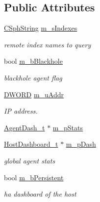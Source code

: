 \subsection*{Public Attributes}
\begin{DoxyCompactItemize}
\item 
\hyperlink{structCSphString}{C\-Sph\-String} \hyperlink{classAgentDesc__c_a027b0d2b65c7114eb9d98262484e6721}{m\-\_\-s\-Indexes}
\begin{DoxyCompactList}\small\item\em remote index names to query \end{DoxyCompactList}\item 
bool \hyperlink{classAgentDesc__c_a1b2031be7860d1ca7164e87299bfa331}{m\-\_\-b\-Blackhole}
\begin{DoxyCompactList}\small\item\em blackhole agent flag \end{DoxyCompactList}\item 
\hyperlink{sphinxstd_8h_a798af1e30bc65f319c1a246cecf59e39}{D\-W\-O\-R\-D} \hyperlink{classAgentDesc__c_a9f0f231fa4e195fb60e1ff31d39a9f9b}{m\-\_\-u\-Addr}
\begin{DoxyCompactList}\small\item\em I\-P address. \end{DoxyCompactList}\item 
\hyperlink{structAgentDash__t}{Agent\-Dash\-\_\-t} $\ast$ \hyperlink{classAgentDesc__c_aa307a0d445fbfdaed3e0f85d9eb3cc18}{m\-\_\-p\-Stats}
\item 
\hyperlink{structHostDashboard__t}{Host\-Dashboard\-\_\-t} $\ast$ \hyperlink{classAgentDesc__c_a7db1c1a813385d67fa69fb71ee6ef468}{m\-\_\-p\-Dash}
\begin{DoxyCompactList}\small\item\em global agent stats \end{DoxyCompactList}\item 
bool \hyperlink{classAgentDesc__c_a0b6849f28e78820dd0083c25c29b904a}{m\-\_\-b\-Persistent}
\begin{DoxyCompactList}\small\item\em ha dashboard of the host \end{DoxyCompactList}\end{DoxyCompactItemize}


